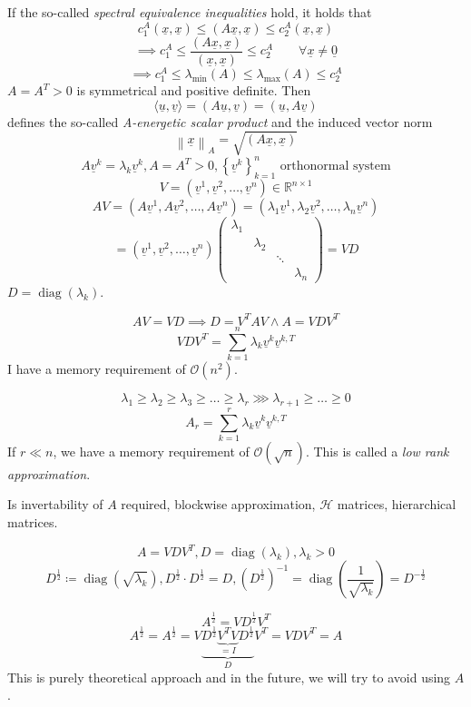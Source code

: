 \documentclass{article}
\newcommand{\set}[1]{\left\{#1\right\}}
\newcommand{\norm}[1]{\left\|#1\right\|}
\begin{document}
If the so-called \emph{spectral equivalence inequalities} hold, it holds that
\[ c_1^A(\underline{x}, \underline{x}) \leq (A\underline{x}, \underline{x}) \leq c_2^A(\underline{x}, \underline{x}) \]
\[ \implies c_1^A \leq \frac{(A\underline{x}, \underline{x})}{(\underline{x}, \underline{x})} \leq c_2^A \qquad \forall \underline{x} \neq \underline{0}  \]
\[ \implies c_1^A \leq \lambda_{\min}(A) \leq \lambda_{\max}(A) \leq c_2^A \]
$A = A^T > 0$ is symmetrical and positive definite. Then
\[ \langle \underline{u}, \underline{v}\rangle = (A\underline{u}, \underline{v}) = (\underline{u}, A\underline{v}) \]
defines the so-called \emph{A-energetic scalar product} and the induced vector norm
\[ \norm{\underline{x}}_A = \sqrt{(A\underline{x}, \underline{x})} \]
\[ A\underline{v}^k = \lambda_k \underline{v}^k, A = A^T > 0, \set{\underline{v}^k}_{k=1}^n \text{ orthonormal system} \]
\[ V = (\underline{v}^1, \underline{v}^2, \ldots, \underline{v}^n) \in \mathbb R^{n\times 1} \]
\[ AV = (A\underline{v}^1, A\underline{v}^2, \ldots, A\underline{v}^n) = (\lambda_1 \underline{v}^1, \lambda_2 \underline{v}^2, \ldots, \lambda_n \underline{v}^n) \]
\[ = (\underline{v}^1, \underline{v}^2, \ldots, \underline{v}^n) \begin{pmatrix} \lambda_1 &  &  & \\ & \lambda_2 & & \\ & & \ddots & \\ & & & \lambda_n \end{pmatrix} = VD \]
$D = \operatorname{diag}(\lambda_k)$.

\[ AV = VD \implies D = V^T AV \land A = VDV^T \]
\[ VDV^T = \sum_{k=1}^n \lambda_k \underline{v}^k \underline{v}^{k,T} \]
I have a memory requirement of $\mathcal O(n^2)$.

\[ \lambda_1 \geq \lambda_2 \geq \lambda_3 \geq \ldots \geq \lambda_r \ggg \lambda_{r+1} \geq \ldots \geq 0 \]
\[ A_r = \sum_{k=1}^r \lambda_k \underline{v}^k \underline{v}^{k,T} \]
If $r \ll n$, we have a memory requirement of $\mathcal O(\sqrt{n})$. This is called a \emph{low rank approximation}.

Is invertability of $A$ required, blockwise approximation, $\mathcal H$ matrices, hierarchical matrices.

\[ A = VDV^T, D = \operatorname{diag}(\lambda_k), \lambda_k > 0 \]
\[ D^{\frac12} \coloneqq \operatorname{diag}(\sqrt{\lambda_k}), D^{\frac12} \cdot D^{\frac12} = D, (D^{\frac12})^{-1} = \operatorname{diag}(\frac{1}{\sqrt{\lambda_k}}) = D^{-\frac12} \]

\[ A^{\frac12} = VD^{\frac12} V^T \]
\[ A^{\frac12} = A^{\frac12} = V\underbrace{D^{\frac12} \underbrace{V^T V}_{=I} D^{\frac12}}_{D} V^T = VDV^T = A \]
This is purely theoretical approach and in the future, we will try to avoid using $A$.
\end{document}
